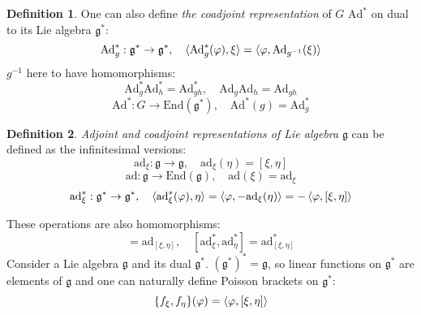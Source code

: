 \documentclass[12pt]{article}
\theoremstyle{definition}
\newtheorem{defin}{Definition}[]
\begin{document}
\begin{defin}
    One can also define \textit{the coadjoint representation} of $G$ $\text{Ad}^*$ on dual to its Lie algebra $\mathfrak{g}^*$:
    \begin{equation}
        \text{Ad}^*_g:\mathfrak{g}^*\rightarrow\mathfrak{g}^*,\quad\braket{\text{Ad}^*_g(\varphi),\xi}=\braket{\varphi,\text{Ad}_{g^{-1}}(\xi)}
    \end{equation}
    $g^{-1}$ here to have homomorphisms:
    \begin{equation}
        \text{Ad}^*_g\text{Ad}^*_h=\text{Ad}^*_{gh},\quad \text{Ad}_g\text{Ad}_h=\text{Ad}_{gh}
    \end{equation}
    \begin{equation}
        \text{Ad}^*:G\rightarrow\text{End}(\mathfrak{g}^*),\quad\text{Ad}^*(g)=\text{Ad}^*_g
    \end{equation}
\end{defin}
\begin{defin}
    \textit{Adjoint and coadjoint representations of Lie algebra} $\mathfrak{g}$ can be defined as the infinitesimal versions:
    \begin{equation}
        \text{ad}_\xi:\mathfrak{g}\rightarrow\mathfrak{g},\quad\text{ad}_\xi(\eta)=[\xi,\eta]
    \end{equation}
    \begin{equation}
        \text{ad}:\mathfrak{g}\rightarrow\text{End}(\mathfrak{g}),\quad\text{ad}(\xi)=\text{ad}_\xi
    \end{equation}
    \begin{equation}
        \text{ad}^*_\xi:\mathfrak{g}^*\rightarrow\mathfrak{g}^*,\quad\braket{\text{ad}^*_\xi(\varphi),\eta}=\braket{\varphi,-\text{ad}_{\xi}(\eta)}=-\braket{\varphi,[\xi,\eta]}
    \end{equation}
\end{defin}
These operations are also homomorphisms:
\begin{equation}
    [\text{ad}_\xi,\text{ad}_\eta]=\text{ad}_{[\xi,\eta]},\quad[\text{ad}^*_\xi,\text{ad}^*_\eta]=\text{ad}^*_{[\xi,\eta]}
\end{equation}
Consider a Lie algebra $\mathfrak{g}$ and its dual $\mathfrak{g}^*$. $(\mathfrak{g}^*)^*=\mathfrak{g}$, so linear functions on $\mathfrak{g}^*$ are elements of $\mathfrak{g}$ and one can naturally define Poisson brackets on $\mathfrak{g}^*$:
\begin{equation}
    \{f_\xi,f_\eta\}(\varphi)=\braket{\varphi,[\xi,\eta]}
\end{equation}
\end{document}
